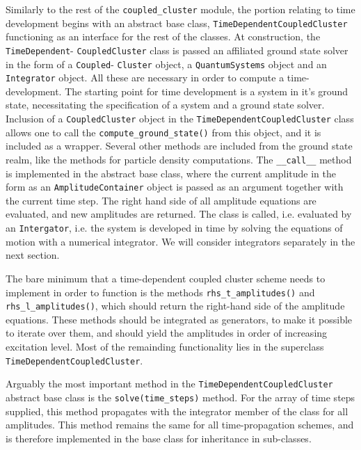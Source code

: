     Similarly to the rest of the \lstinline{coupled_cluster} module, the portion relating
    to time development begins with an abstract base class,
    \lstinline{TimeDependentCoupledCluster}
    functioning as an interface for the rest of the classes. At construction, the 
    \lstinline{TimeDependent}- \lstinline{CoupledCluster} class is passed an affiliated 
    ground state solver in the form of a \lstinline{Coupled}- \lstinline{Cluster} object, a 
    \lstinline{QuantumSystems} object and an \lstinline{Integrator} object. All these 
    are necessary in order to compute a time-development. The starting point for 
    time development is a system in it's ground state, necessitating the specification 
    of a system and a ground state solver.
    Inclusion of a \lstinline{CoupledCluster} object in the 
    \lstinline{TimeDependentCoupledCluster} class allows one to call the 
    \lstinline{compute_ground_state()} from this object, and it is included as a 
    wrapper. Several other methods are included from the ground state realm, like 
    the methods for particle density computations. 
    The \lstinline{__call__} method is implemented in 
    the abstract base class, where the current amplitude in the form as an 
    \lstinline{AmplitudeContainer} object is passed as an argument 
    together with the current time step. The right hand side of all amplitude equations 
    are evaluated, and new amplitudes are returned. The class is called, i.e. evaluated 
    by an \lstinline{Intergator}, i.e. the system is developed in time by solving 
    the equations of motion with a numerical integrator.  We will consider 
    integrators separately in the next section.

    The bare minimum that a time-dependent coupled cluster scheme needs to implement 
    in order to function is the methods \lstinline{rhs_t_amplitudes()} and 
    \lstinline{rhs_l_amplitudes()}, which should return the right-hand side of 
    the amplitude equations. These methods should be integrated as generators, to make 
    it possible to iterate over them, and should yield the amplitudes in order of 
    increasing excitation level. Most of the remainding functionality lies in the 
    superclass \lstinline{TimeDependentCoupledCluster}.

    Arguably the most important method in the \lstinline{TimeDependentCoupledCluster}
    abstract base class is the \lstinline{solve(time_steps)} method. For the array 
    of time steps supplied, this method propagates with the integrator member of the 
    class for all amplitudes. This method remains the same for all time-propagation 
    schemes, and is therefore implemented in the base class for inheritance in 
    sub-classes. 

